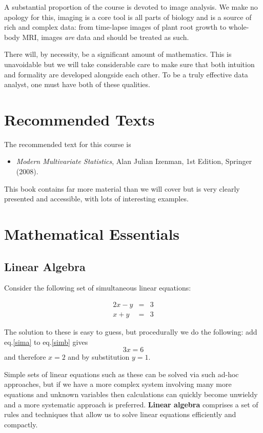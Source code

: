 \documentclass[12pt,a4paper]{tufte-handout}
\begin{document}
A substantial proportion of the course is devoted to image analysis. We make no apology for this, imaging is a core tool is all parts of biology and is a source of rich and complex data: from time-lapse images of plant root growth to whole-body MRI, images \textit{are} data and should be treated as such.

There will, by necessity, be a significant amount of mathematics. This is unavoidable but we will take considerable care to make sure that both intuition and formality are developed alongside each other. To be a truly effective data analyst, one must have both of these qualities.

\section{Recommended Texts}

The recommended text for this course is
\begin{itemize}
  \item \textit{Modern Multivariate Statistics}, Alan Julian Izenman, 1st Edition, Springer (2008).
\end{itemize}

This book contains far more material than we will cover but is very clearly presented and accessible, with lots of interesting examples.

\section{Mathematical Essentials}

\subsection{Linear Algebra}

Consider the following set of simultaneous linear equations:

\begin{eqnarray}
  2x-y &=& 3 \label{sima}\\
  x+y &=&3 \label{simb}
\end{eqnarray}

The solution to these is easy to guess, but procedurally we do the following: add eq.\eqref{sima} to eq.\eqref{simb} gives
\begin{equation}
  3x=6
\end{equation}
and therefore $x=2$ and by substitution $y=1$.

Simple sets of linear equations such as these can be solved via such ad-hoc approaches, but if we have a more complex system involving many more equations and unknown variables then calculations can quickly become unwieldy and a more systematic approach is preferred. \textbf{Linear algebra} comprises a set of rules and techniques that allow us to solve linear equations efficiently and compactly.
\end{document}
